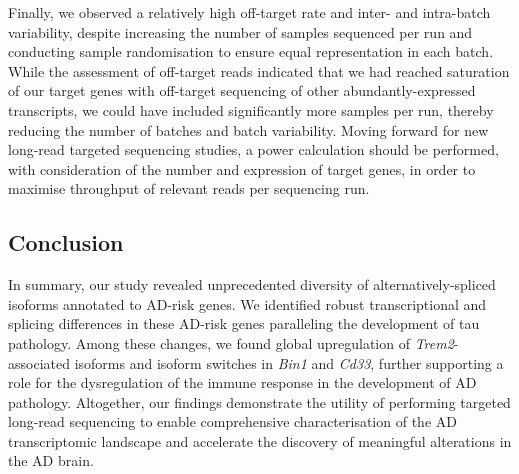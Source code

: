 Finally, we observed a relatively high off-target rate and inter- and intra-batch variability, despite increasing the number of samples sequenced per run and conducting sample randomisation to ensure equal representation in each batch. While the assessment of off-target reads indicated that we had reached saturation of our target genes with off-target sequencing of other abundantly-expressed transcripts, we could have included significantly more samples per run, thereby reducing the number of batches and batch variability. Moving forward for new long-read targeted sequencing studies, a power calculation should be performed, with consideration of the number and expression of target genes, in order to maximise throughput of relevant reads per sequencing run.      
    
\subsection{Conclusion}
In summary, our study revealed unprecedented diversity of alternatively-spliced isoforms annotated to AD-risk genes. We identified robust transcriptional and splicing differences in these AD-risk genes paralleling the development of tau pathology. Among these changes, we found global upregulation of \textit{Trem2}-associated isoforms and isoform switches in \textit{Bin1} and \textit{Cd33}, further supporting a role for the dysregulation of the immune response in the development of AD pathology. Altogether, our findings demonstrate the utility of performing targeted long-read sequencing to enable comprehensive characterisation of the AD transcriptomic landscape and accelerate the discovery of meaningful alterations in the AD brain.  


